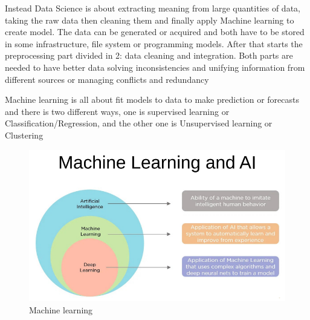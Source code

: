 Instead Data Science is about extracting meaning from large quantities of data, taking the raw data then cleaning them and finally apply Machine learning to create model.
The data can be generated or acquired and both have to be stored in some infrastructure, file system or programming models. After that starts the preprocessing part divided in 2: data cleaning and integration. Both parts are needed to have better data solving inconsistencies and unifying information from different sources or managing conflicts and redundancy

Machine learning is all about fit models to data to make prediction or forecasts and there is two different ways, one is supervised learning or Classification/Regression, and the other one is Unsupervised learning or Clustering

\begin{figure}[H]
    \centering
    \includegraphics[scale=0.5]{images/Introduction/Intro2.png}
    \caption{Machine learning}
    \label{fig:enter-label}
\end{figure}